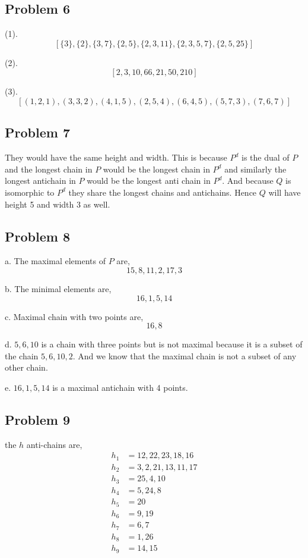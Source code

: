 \documentclass[a4paper]{report}
\begin{document}
\subsection*{Problem 6}
(1). 
$$ [\{3\}, \{2\}, \{3,7\},\{2,5\}, \{2,3,11\}, \{2,3,5,7\}, \{2,5,25\}] $$ 


(2). 
$$ [2, 3, 10, 66, 21, 50, 210] $$ 


(3). 
$$ [(1,2,1), (3,3,2), (4,1,5), (2,5,4), (6,4,5), (5,7,3), (7,6,7)] $$ 


\subsection*{Problem 7}
They would have the same height and width. This is because $P^{d}$ is the dual of $P$ and the longest chain in $P$ would be the longest chain in $P^{d}$ and similarly the longest antichain in $P$ would be the longest anti chain in  $P^{d}$. And because $Q$ is isomorphic to $P^{d}$ they share the longest chains and antichains. Hence $Q$ will have height 5 and width 3 as well.

\subsection*{Problem 8}
a. The maximal elements of $P$ are, 
$$ 15, 8, 11, 2, 17, 3 $$ 

b. The minimal elements are, 
$$ 16, 1, 5, 14 $$  

c. Maximal chain with two points are, 
$$ 16, 8 $$ 

d. $5, 6, 10$ is a chain with three points but is not maximal because it is a subset of the chain  $5,6,10,2$. And we know that the maximal chain is not a subset of any other chain.

e. $16, 1, 5, 14$ is a maximal antichain with 4 points.

\subsection*{Problem 9}
the $h$ anti-chains are, 
\begin{align*}
    h_1 &=12, 22, 23, 18, 16\\
    h_2 &=  3, 2, 21, 13, 11, 17\\
    h_3 &=  25, 4, 10\\
    h_4 &= 5, 24, 8\\
    h_5 &= 20\\
    h_6 &= 9, 19\\
    h_7 &= 6, 7\\
    h_8 &= 1, 26\\
    h_9 &= 14, 15
\end{align*}
\end{document}
